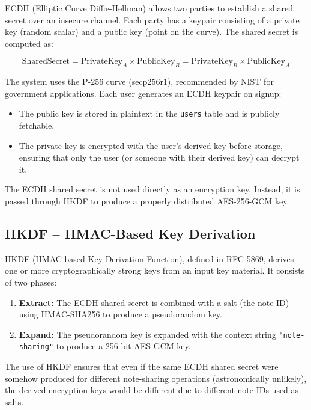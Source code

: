ECDH (Elliptic Curve Diffie-Hellman) allows two parties to establish a shared secret over an insecure channel. Each party has a keypair consisting of a private key (random scalar) and a public key (point on the curve). The shared secret is computed as:

\[
\text{SharedSecret} = \text{PrivateKey}_A \times \text{PublicKey}_B = \text{PrivateKey}_B \times \text{PublicKey}_A
\]

The system uses the P-256 curve (secp256r1), recommended by NIST for government applications. Each user generates an ECDH keypair on signup:
\begin{itemize}
    \item The public key is stored in plaintext in the \texttt{users} table and is publicly fetchable.
    \item The private key is encrypted with the user's derived key before storage, ensuring that only the user (or someone with their derived key) can decrypt it.
\end{itemize}

The ECDH shared secret is not used directly as an encryption key. Instead, it is passed through HKDF to produce a properly distributed AES-256-GCM key.

\subsection{HKDF -- HMAC-Based Key Derivation}

HKDF (HMAC-based Key Derivation Function), defined in RFC 5869, derives one or more cryptographically strong keys from an input key material. It consists of two phases:

\begin{enumerate}
    \item \textbf{Extract:} The ECDH shared secret is combined with a salt (the note ID) using HMAC-SHA256 to produce a pseudorandom key.
    \item \textbf{Expand:} The pseudorandom key is expanded with the context string \texttt{"note-sharing"} to produce a 256-bit AES-GCM key.
\end{enumerate}

The use of HKDF ensures that even if the same ECDH shared secret were somehow produced for different note-sharing operations (astronomically unlikely), the derived encryption keys would be different due to different note IDs used as salts.

